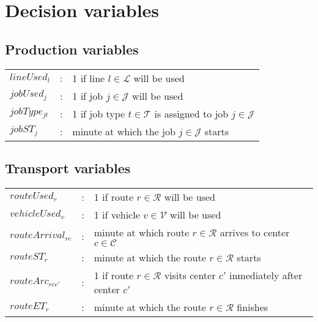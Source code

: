 \section{Decision variables}

\subsection{Production variables}

\begin{tabular}{p{15mm}lp{105mm}}
    $lineUsed_{l}$    & : & 1 if line $l \in \mathcal{L}$ will be used  \\  
    $jobUsed_{j}$    & : & 1 if job $j \in \mathcal{J}$ will be used  \\  
    $jobType_{jt}$    & : & 1 if job type $t \in \mathcal{T}$ is assigned to job $j \in \mathcal{J}$ \\  
    $jobST_{j}$    & : & minute at which the job $j \in \mathcal{J}$ starts \\  
\end{tabular}
\bigskip

\subsection{Transport variables}

\begin{tabular}{p{15mm}lp{105mm}}
    $routeUsed_{r}$    & : & 1 if route $r \in \mathcal{R}$ will be used  \\  
    $vehicleUsed_{v}$    & : & 1 if vehicle $v \in \mathcal{V}$ will be used  \\  
    $routeArrival_{rc}$    & : & minute at which route $r \in \mathcal{R}$ arrives to center $c \in \mathcal{C}$ \\  
    $routeST_{r}$    & : & minute at which the route $r \in \mathcal{R}$ starts \\
    $routeArc_{rcc'}$    & : & 1 if route $r \in \mathcal{R}$ visits center $c'$ inmediately after center $c'$  \\
    $routeET_{r}$    & : & minute at which the route $r \in \mathcal{R}$ finishes \\
\end{tabular}
\bigskip

